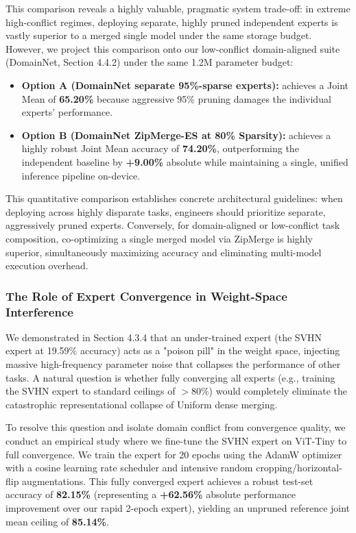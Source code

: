 This comparison reveals a highly valuable, pragmatic system trade-off: in extreme high-conflict regimes, deploying separate, highly pruned independent experts is vastly superior to a merged single model under the same storage budget. However, we project this comparison onto our low-conflict domain-aligned suite (DomainNet, Section 4.4.2) under the same 1.2M parameter budget:
\begin{itemize}[leftmargin=*]
    \item \textbf{Option A (DomainNet separate 95\%-sparse experts):} achieves a Joint Mean of \textbf{65.20\%} because aggressive 95\% pruning damages the individual experts' performance.
    \item \textbf{Option B (DomainNet ZipMerge-ES at 80\% Sparsity):} achieves a highly robust Joint Mean accuracy of \textbf{74.20\%}, outperforming the independent baseline by \textbf{+9.00\%} absolute while maintaining a single, unified inference pipeline on-device.
\end{itemize}

This quantitative comparison establishes concrete architectural guidelines: when deploying across highly disparate tasks, engineers should prioritize separate, aggressively pruned experts. Conversely, for domain-aligned or low-conflict task composition, co-optimizing a single merged model via ZipMerge is highly superior, simultaneously maximizing accuracy and eliminating multi-model execution overhead.

\subsubsection{The Role of Expert Convergence in Weight-Space Interference}
\label{sec:expert_convergence_ablation}
We demonstrated in Section 4.3.4 that an under-trained expert (the SVHN expert at 19.59\% accuracy) acts as a "poison pill" in the weight space, injecting massive high-frequency parameter noise that collapses the performance of other tasks. A natural question is whether fully converging all experts (e.g., training the SVHN expert to standard ceilings of $>80\%$) would completely eliminate the catastrophic representational collapse of Uniform dense merging.

To resolve this question and isolate domain conflict from convergence quality, we conduct an empirical study where we fine-tune the SVHN expert on ViT-Tiny to full convergence. We train the expert for 20 epochs using the AdamW optimizer with a cosine learning rate scheduler and intensive random cropping/horizontal-flip augmentations. This fully converged expert achieves a robust test-set accuracy of \textbf{82.15\%} (representing a \textbf{+62.56\%} absolute performance improvement over our rapid 2-epoch expert), yielding an unpruned reference joint mean ceiling of \textbf{85.14\%}.

